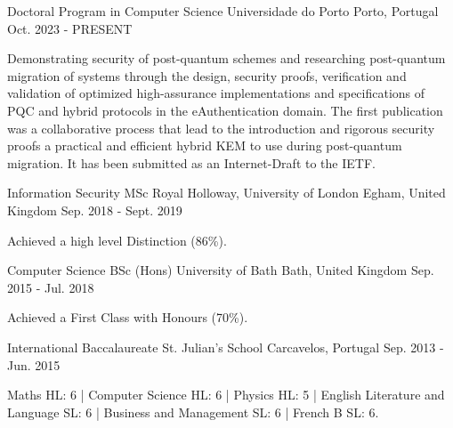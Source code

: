 \begin{cventries}
  \cventry
  {Doctoral Program in Computer Science}
  {Universidade do Porto}
  {Porto, Portugal}
  {Oct. 2023 - PRESENT}
  {
    \begin{cvitems}
      \item {Demonstrating security of post-quantum schemes and researching post-quantum migration of systems through the design, security proofs, verification and validation of optimized high-assurance implementations and specifications of PQC and hybrid protocols in the eAuthentication domain.
      The first publication was a collaborative process that lead to the introduction and rigorous security proofs a practical and efficient hybrid KEM to use during post-quantum migration. It has been submitted as an Internet-Draft to the IETF.}
    \end{cvitems}
  }
  \cventry
  {Information Security MSc}
  {Royal Holloway, University of London}
  {Egham, United Kingdom}
  {Sep. 2018 - Sept. 2019}
  {
    \begin{cvitems}
      \item {Achieved a high level Distinction (86\%).}
    \end{cvitems}
  }
  \cventry
  {Computer Science BSc (Hons)}
  {University of Bath}
  {Bath, United Kingdom}
  {Sep. 2015 - Jul. 2018}
  {
    \begin{cvitems}
      \item {Achieved a First Class with Honours (70\%).}
    \end{cvitems}
  }
  \cventry
  {International Baccalaureate}
  {St. Julian's School}
  {Carcavelos, Portugal}
  {Sep. 2013 - Jun. 2015}
  {
    \begin{cvitems}
      \item{Maths HL: 6 | Computer Science HL: 6 | Physics HL: 5 | English Literature and Language SL: 6 | Business and Management SL: 6 | French B SL: 6.}
    \end{cvitems}
  }
\end{cventries}